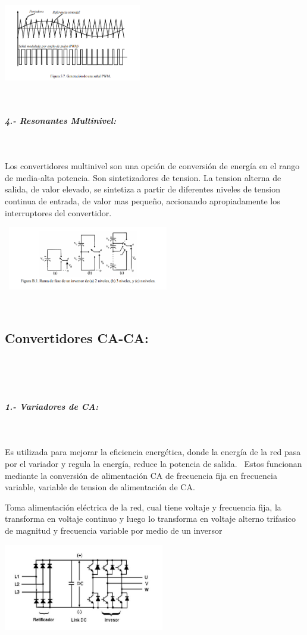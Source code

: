 \documentclass[12pt,letterpaper]{article}
\begin{document}
\

\includegraphics[width=6cm]{Modulada.png}
\

\
\subparagraph{4.- Resonantes Multinivel:}
\

Los convertidores  multinivel son una opción de conversión de energía en el rango de media-alta potencia.
Son sintetizadores de tension. La tension alterna de salida, de valor elevado, se sintetiza a partir de diferentes niveles de tension continua de entrada, de valor mas pequeño, accionando apropiadamente los interruptores del convertidor.
\

\
\includegraphics[width=7cm]{Multinivel.png}   
\

\
\subsection{Convertidores CA-CA:}
\

\
\subparagraph{1.- Variadores de CA:}
\

Es utilizada para mejorar la eficiencia energética, donde la energía de la red pasa por el variador y regula la energía, reduce la potencia de salida.
\
Estos funcionan mediante la conversión de alimentación CA de frecuencia fija en frecuencia variable, variable de tension de alimentación de CA.
\

Toma alimentación eléctrica de la red, cual tiene voltaje y frecuencia fija, la transforma en voltaje continuo y luego lo transforma en voltaje alterno trifasico de magnitud y frecuencia variable por medio de un inversor
\


\includegraphics[width=7cm]{Variadores CA.png} 
\
\end{document}
